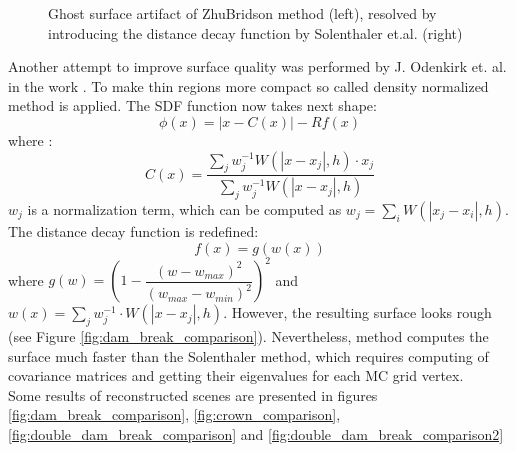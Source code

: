 \begin{figure}[H]
\begin{center}
\begin{subfigure}[b]{0.45\textwidth}
		\end{subfigure}
	\end{center}
	\caption{Ghost surface artifact of ZhuBridson method (left), resolved by introducing the  distance decay function by Solenthaler et.al. (right)}
	\label{fig:ZB_vs_Solenthaler}
\end{figure}
Another attempt to improve surface quality was performed by J. Odenkirk et. al. in the work \cite{OnderikEtAl}. To make thin regions more compact so called density normalized method is applied. The SDF function now takes next shape:
\begin{equation}
	\phi(x) = |x - C(x)| - Rf(x)
\end{equation}
where :
\begin{equation}
	C(x) = \dfrac{\sum_j w_j^{-1} W(|x - x_j|, h) \cdot x_j}{\sum_j w_j^{-1} W(|x - x_j|, h)}
\end{equation}
$w_j$ is a normalization term, which can be computed as $w_j = \sum_i W(|x_j - x_i|, h)$. The distance decay
function is redefined:
\begin{equation}
	f(x) = g(w(x))
\end{equation}
where $g(w) = (1 - \dfrac{(w - w_{max})^2}{(w_{max} - w_{min})^2})^2$ and $w(x) = \sum_j{w_j^{-1} \cdot W(|x - x_j|, h)}$. However, the resulting surface looks rough (see Figure \ref{fig:dam_break_comparison}). Nevertheless, method computes the surface much faster than the Solenthaler method, which requires computing of covariance matrices and getting their eigenvalues for each MC grid vertex.\\
Some results of reconstructed scenes are presented in figures \ref{fig:dam_break_comparison}, \ref{fig:crown_comparison}, \ref{fig:double_dam_break_comparison} and \ref{fig:double_dam_break_comparison2}
